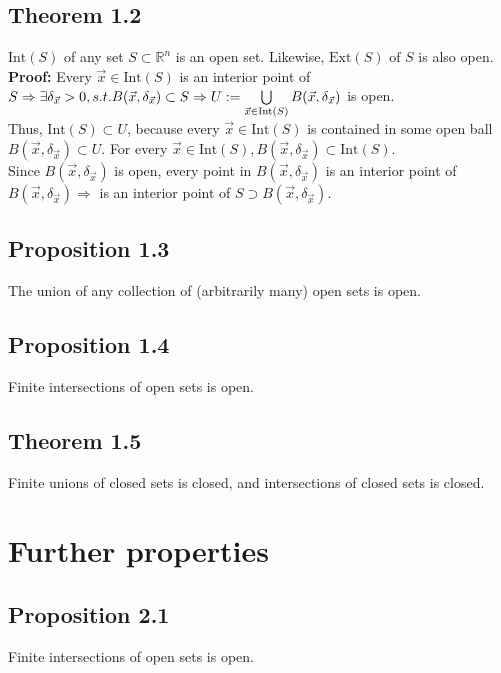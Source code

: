 \documentclass[11pt, a4paper]{article}
\begin{document}
    \subsection{Theorem 1.2}
    $\text{Int}(S)$ of any set $S \subset \mathbb{R}^n$ is an open set. Likewise, $\text{Ext}(S) \text{ of } S$ is also open. \\
        \textbf{Proof:} Every $\vec{x} \in \text{Int}(S)$ is an interior point of $S \\ \Rightarrow \exists \delta_{\vec{x}} > 0, s.t. B(\vec{x}, \delta_{\vec{x}}) \subset S \\
        \Rightarrow U := \bigcup\limits_{\vec{x} \in \mathrm{Int}(S)} B(\vec{x}, \delta_{\vec{x}})$ is open. \\
        Thus, $\text{Int}(S) \subset U$, because every $\vec{x} \in \text{Int}(S)$ is contained in some open ball \\ $B(\vec{x}, \delta_{\vec{x}}) \subset U$. For every $\vec{x} \in \text{Int}(S), B(\vec{x}, \delta_{\vec{x}}) \subset \text{Int}(S)$. \\
        Since $B(\vec{x}, \delta_{\vec{x}})$ is open, every point in $B(\vec{x}, \delta_{\vec{x}})$ is an interior point of $B(\vec{x}, \delta_{\vec{x}}) \Rightarrow$ is an interior point of $S \supset B(\vec{x}, \delta_{\vec{x}})$.
    \subsection{Proposition 1.3}
    The union of any collection of (arbitrarily many) open sets is open.
    \subsection{Proposition 1.4}
    Finite intersections of open sets is open.
    \subsection{Theorem 1.5}
    Finite unions of closed sets is closed, and intersections of closed sets is closed.
\section{Further properties}
    \subsection{Proposition 2.1}
    Finite intersections of open sets is open.
\end{document}
